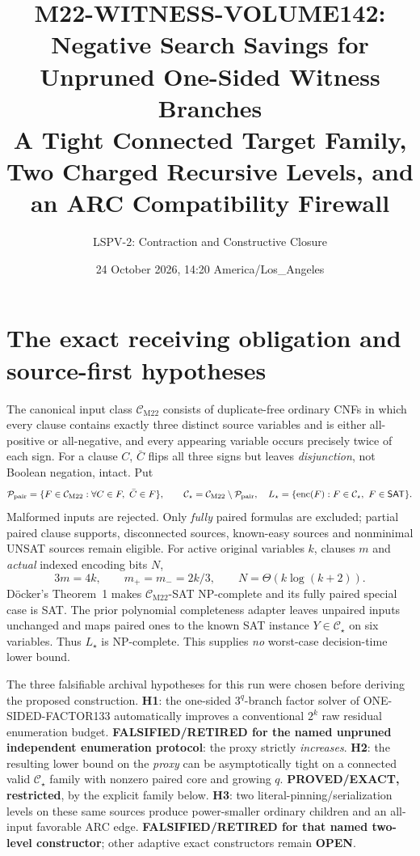 \documentclass[11pt]{article}
\title{M22-WITNESS-VOLUME142: Negative Search Savings for Unpruned One-Sided Witness Branches\\
\large A Tight Connected Target Family, Two Charged Recursive Levels, and an ARC Compatibility Firewall}
\author{LSPV-2: Contraction and Constructive Closure}
\date{24 October 2026, 14:20 America/Los\_Angeles}
\newcommand{\CM}{\mathcal C_{\mathrm{M22}}}
\newcommand{\CS}{\mathcal C_\star}
\newcommand{\SAT}{\mathsf{SAT}}
\begin{document}
\maketitle
\begin{center}
\end{center}

\section{The exact receiving obligation and source-first hypotheses}
The canonical input class \(\CM\) consists of duplicate-free ordinary CNFs in which every clause contains exactly three distinct source variables and is either all-positive or all-negative, and every appearing variable occurs precisely twice of each sign. For a clause \(C\), \(\bar C\) flips all three signs but leaves \emph{disjunction}, not Boolean negation, intact. Put
\[
\mathcal P_{\rm pair}=\{F\in\CM:\forall C\in F,\ \bar C\in F\},\qquad
\CS=\CM\setminus\mathcal P_{\rm pair},\quad
L_\star=\{\operatorname{enc}(F):F\in\CS,\ F\in\SAT\}.
\]
Malformed inputs are rejected. Only \emph{fully} paired formulas are excluded; partial paired clause supports, disconnected sources, known-easy sources and nonminimal UNSAT sources remain eligible. For active original variables \(k\), clauses \(m\) and \emph{actual} indexed encoding bits \(N\),
\[
3m=4k,\qquad m_+=m_-=2k/3,\qquad N=\Theta(k\log(k+2)).
\]
D\"ocker's Theorem~1 \cite{docker} makes \(\CM\)-SAT NP-complete and its fully paired special case is SAT. The prior polynomial completeness adapter leaves unpaired inputs unchanged and maps paired ones to the known SAT instance \(Y\in\CS\) on six variables. Thus \(L_\star\) is NP-complete. This supplies \emph{no} worst-case decision-time lower bound.

The three falsifiable archival hypotheses for this run were chosen before deriving the proposed construction. \textbf{H1}: the one-sided \(3^q\)-branch factor solver of ONE-SIDED-FACTOR133 automatically improves a conventional \(2^k\) raw residual enumeration budget. \textbf{FALSIFIED/RETIRED for the named unpruned independent enumeration protocol}: the proxy strictly \emph{increases}. \textbf{H2}: the resulting lower bound on the \emph{proxy} can be asymptotically tight on a connected valid \(\CS\) family with nonzero paired core and growing \(q\). \textbf{PROVED/EXACT, restricted}, by the explicit family below. \textbf{H3}: two literal-pinning/serialization levels on these same sources produce power-smaller ordinary children and an all-input favorable ARC edge. \textbf{FALSIFIED/RETIRED for that named two-level constructor}; other adaptive exact constructors remain \textbf{OPEN}.
\end{document}

